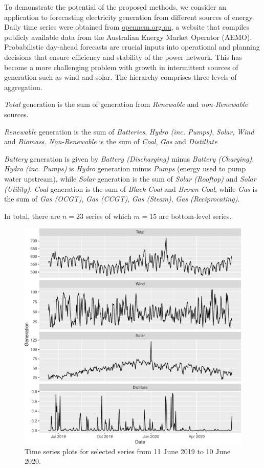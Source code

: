 \documentclass[a4paper,12pt]{article}
\theoremstyle{definition}
\begin{document}
To demonstrate the potential of the proposed methods, we consider an application to forecasting electricity generation from different sources of energy. Daily time series were obtained from \url{opennem.org.au}, a website that compiles publicly available data from the Australian Energy Market Operator (AEMO)\@. Probabilistic day-ahead forecasts are crucial inputs into operational and planning decisions that ensure efficiency and stability of the power network. This has become a more challenging problem with growth in intermittent sources of generation such as wind and solar. The hierarchy comprises three levels of aggregation.
\begin{compactenum}
	\item \textit{Total} generation is the sum of generation from \textit{Renewable} and \textit{non-Renewable} sources.
	\item \textit{Renewable} generation is the sum of \textit{Batteries}, \textit{Hydro (inc. Pumps)}, \textit{Solar}, \textit{Wind} and \textit{Biomass}. \textit{Non-Renewable} is the sum of \textit{Coal}, \textit{Gas} and \textit{Distillate}
	\item \textit{Battery} generation is given by \textit{Battery (Discharging)} minus \textit{Battery (Charging)}, \textit{Hydro (inc. Pumps)} is \textit{Hydro} generation minus \textit{Pumps} (energy used to pump water upstream), while \textit{Solar} generation is the sum of \textit{Solar (Rooftop)} and \textit{Solar (Utility)}. \textit{Coal} generation is the sum of \textit{Black Coal} and \textit{Brown Coal}, while \textit{Gas} is the sum of \textit{Gas (OCGT)}, \textit{Gas (CCGT)}, \textit{Gas (Steam)}, \textit{Gas (Reciprocating)}.
\end{compactenum}
In total, there are $n=23$ series of which $m=15$ are bottom-level series.

\begin{figure}[!htb]
  \centering
  \includegraphics[width=.75\textwidth]{Figs/selected.pdf}
  \caption{Time series plots for selected series from 11 June 2019 to 10 June 2020.}
  \label{fig:selected}
\end{figure}
\end{document}
